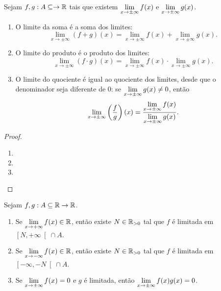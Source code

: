 \begin{theorem}
    Sejam $f,g : A \subseteq \to \mathbb{R}$ tais que existem $\displaystyle \lim_{x \to \pm \infty} f(x)$ e $\displaystyle \lim_{x \to \pm \infty} g(x)$.
        \begin{enumerate}[leftmargin=*, align=left, label=\textbf{(\alph*)}]
            \item O limite da soma é a soma dos limites:
                \[
                    \lim_{x \to \pm \infty} (f+g)(x) = \lim_{x \to \pm \infty} f(x) + \lim_{x \to \pm \infty} g(x).
                \]
            \item O limite do produto é o produto dos limites:
                \[
                    \lim_{x \to \pm \infty} (f \cdot g)(x) = \lim_{x \to \pm \infty} f(x) \cdot \lim_{x \to \pm \infty} g(x).
                \]
            \item O limite do quociente é igual ao quociente dos limites, desde que o denominador seja diferente de $0$: se $\displaystyle \lim_{x \to \pm \infty} g(x) \neq 0$, então
                \[
                    \lim_{x \to \pm \infty} \left(\dfrac{f}{g} \right)(x) = \dfrac{\displaystyle \lim_{x \to \pm \infty} f(x)}{\displaystyle \lim_{x \to \pm \infty} g(x)}.
                \]
        \end{enumerate}
\end{theorem}

\begin{proof}
    \leavevmode
        \begin{enumerate}[leftmargin=*, align=left, label=\textbf{(\alph*)}]
            \item \blackproof
            \item \blackproof
            \item \blackproof
        \end{enumerate}
\end{proof}

\begin{proposition}
    Sejam $f,g : A \subseteq \mathbb{R} \to \mathbb{R}$.
        \begin{enumerate}[leftmargin=*, align=left, label=\textbf{(\alph*)}]
            \item Se $\displaystyle \lim_{x \to + \infty} f(x) \in \mathbb{R}$, então existe $N \in \mathbb{R}_{>0}$ tal que $f$ é limitada em $\left[ N,+\infty \right[ \cap A$.
            \item Se $\displaystyle \lim_{x \to - \infty} f(x) \in \mathbb{R}$, então existe $N \in \mathbb{R}_{>0}$ tal que $f$ é limitada em $\left[-\infty, -N \right[ \cap A$.
            \item Se $\displaystyle \lim_{x \to \pm \infty} f(x) = 0$ e $g$ é limitada, então $\displaystyle \lim_{x \to \pm \infty} f(x)g(x) = 0$.
        \end{enumerate}
\end{proposition}

